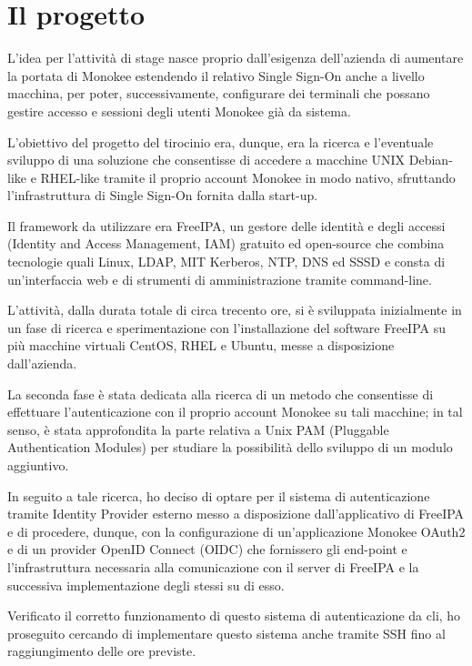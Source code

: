 \section{Il progetto}

L'idea per l'attività di stage nasce proprio dall'esigenza dell'azienda di aumentare la portata di Monokee estendendo il 
relativo Single Sign-On anche a livello macchina, per poter, successivamente, configurare dei terminali
che possano gestire accesso e sessioni degli utenti Monokee già da sistema.

L'obiettivo del progetto del tirocinio era, dunque, era la ricerca e l'eventuale sviluppo di una soluzione che consentisse
di accedere a macchine UNIX Debian-like e RHEL-like tramite il proprio account Monokee in modo nativo, sfruttando l'infrastruttura
di Single Sign-On fornita dalla start-up.

Il framework da utilizzare era FreeIPA, un gestore delle identità e degli accessi (Identity and Access Management, IAM)
gratuito ed open-source che combina tecnologie quali Linux, LDAP, MIT Kerberos, NTP, DNS ed SSSD e consta di un'interfaccia web
e di strumenti di amministrazione tramite command-line. 

L'attività, dalla durata totale di circa trecento ore, si è sviluppata inizialmente in un fase di ricerca e sperimentazione
con l'installazione del software FreeIPA su più macchine virtuali CentOS, RHEL e Ubuntu,
messe a disposizione dall'azienda.

La seconda fase è stata dedicata alla ricerca di un metodo che consentisse di effettuare l'autenticazione con il
proprio account Monokee su tali macchine; in tal senso, è stata approfondita la parte relativa a 
Unix PAM (Pluggable Authentication Modules) per studiare la possibilità dello sviluppo di un modulo aggiuntivo. 

In seguito a tale ricerca, ho deciso di optare per il sistema di autenticazione tramite Identity Provider esterno
messo a disposizione dall'applicativo di FreeIPA e di procedere, dunque, con la configurazione di un'applicazione
Monokee OAuth2 e di un provider OpenID Connect (OIDC) che fornissero gli end-point e l'infrastruttura 
necessaria alla comunicazione con il server di FreeIPA e la successiva implementazione degli stessi su di esso. 

Verificato il corretto funzionamento di questo sistema di autenticazione da \gls{cli},
ho proseguito cercando di implementare questo sistema anche tramite SSH fino al raggiungimento delle ore previste.


